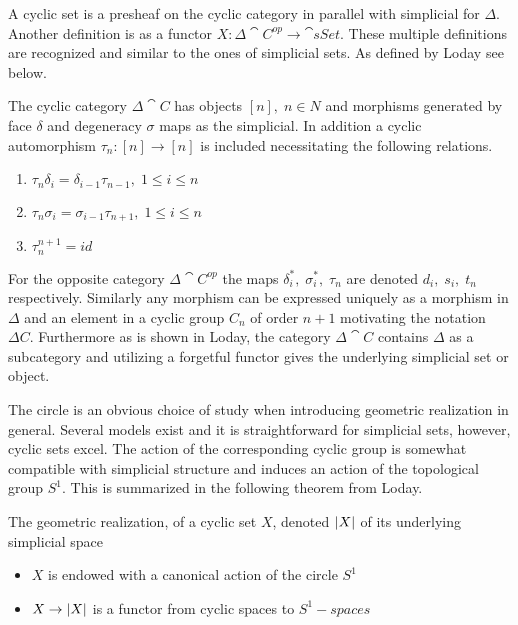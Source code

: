 \documentclass[../../main.tex]{subfiles}
\begin{document}
    A cyclic set is a presheaf on the cyclic category in parallel with  simplicial for $\Delta$. Another definition is as a functor $X:\Delta \cat{C^{op}} \to \cat{sSet}$. These multiple definitions are recognized and similar to the ones of simplicial sets. As defined by Loday see below.
    
    \begin{definition}
        The cyclic category $\Delta \cat{C}$ has objects $[n], \;n\in N$ and morphisms generated by face $\delta$ and degeneracy $\sigma$ maps as the simplicial. In addition a cyclic automorphism $\tau_n:[n]\to [n]$ is included necessitating the following relations.
        \begin{enumerate}
            \item $\tau _n\delta_i=\delta_{i-1}\tau_{n-1},\; 1 \leq i\leq n$
            \item $\tau _n \sigma_i=\sigma_{i-1}\tau_{n+1},\; 1 \leq i\leq n$
            \item $\tau_{n}^{n+1}=id$
        \end{enumerate}
    \end{definition}

    For the opposite category $\Delta \cat{C^{op}}$ the maps $\delta_i^*, \; \sigma_i^*,\;\tau_n$ are denoted $d_i,\; s_i, \; t_n$ respectively. Similarly any morphism can be expressed uniquely as a morphism in $\Delta$ and an element in a cyclic group $C_n$ of order $n+1$ motivating the notation $\Delta C$. Furthermore as is shown in Loday, the category $\Delta \cat{C}$ contains $\Delta$ as a subcategory and utilizing a forgetful functor gives the underlying simplicial set or object. 

    The circle is an obvious choice of study when introducing geometric realization in general. Several models exist and it is straightforward for simplicial sets, however, cyclic sets excel. The action of the corresponding cyclic group is somewhat compatible with simplicial structure and induces an action of the topological group $S^1$. This is summarized in the following theorem from Loday.

    \begin{theorem}
        The geometric realization, of a cyclic set $X$, denoted $\geom[X]$ of its underlying simplicial space
        \begin{itemize}
            \item $X$ is endowed with a canonical action of the circle $S^1$
            \item $X \to \geom[X]$ is a functor from cyclic spaces to $S^1-spaces$
        \end{itemize}
    \end{theorem} %
\end{document}
